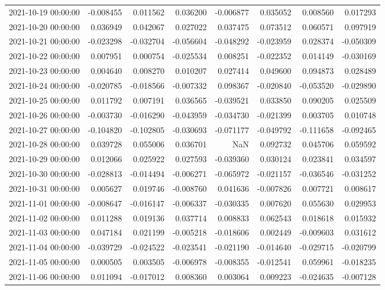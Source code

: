 \begin{tabular}{lrrrrrrr}
2021-10-19 00:00:00 & -0.008455 & 0.011562 & 0.036200 & -0.006877 & 0.035052 & 0.008560 & 0.017293 \\
2021-10-20 00:00:00 & 0.036949 & 0.042067 & 0.027022 & 0.037475 & 0.073512 & 0.060571 & 0.097919 \\
2021-10-21 00:00:00 & -0.023298 & -0.032704 & -0.056604 & -0.048292 & -0.023959 & 0.028374 & -0.050309 \\
2021-10-22 00:00:00 & 0.007951 & 0.000754 & -0.025534 & 0.008251 & -0.022352 & 0.014149 & -0.030169 \\
2021-10-23 00:00:00 & 0.004640 & 0.008270 & 0.010207 & 0.027414 & 0.049600 & 0.094873 & 0.028489 \\
2021-10-24 00:00:00 & -0.020785 & -0.018566 & -0.007332 & 0.098367 & -0.020840 & -0.053520 & -0.029890 \\
2021-10-25 00:00:00 & 0.011792 & 0.007191 & 0.036565 & -0.039521 & 0.033850 & 0.090205 & 0.025509 \\
2021-10-26 00:00:00 & -0.003730 & -0.016290 & -0.043959 & -0.034730 & -0.021399 & 0.003705 & 0.010748 \\
2021-10-27 00:00:00 & -0.104820 & -0.102805 & -0.030693 & -0.071177 & -0.049792 & -0.111658 & -0.092465 \\
2021-10-28 00:00:00 & 0.039728 & 0.055006 & 0.036701 & NaN & 0.092732 & 0.045706 & 0.059592 \\
2021-10-29 00:00:00 & 0.012066 & 0.025922 & 0.027593 & -0.039360 & 0.030124 & 0.023841 & 0.034597 \\
2021-10-30 00:00:00 & -0.028813 & -0.014494 & -0.006271 & -0.065972 & -0.021157 & -0.036546 & -0.031252 \\
2021-10-31 00:00:00 & 0.005627 & 0.019746 & -0.008760 & 0.041636 & -0.007826 & 0.007721 & 0.008617 \\
2021-11-01 00:00:00 & -0.008647 & -0.016147 & -0.006337 & -0.030335 & 0.007620 & 0.055630 & 0.029953 \\
2021-11-02 00:00:00 & 0.011288 & 0.019136 & 0.037714 & 0.008833 & 0.062543 & 0.018618 & 0.015932 \\
2021-11-03 00:00:00 & 0.047184 & 0.021199 & -0.005218 & -0.018606 & 0.002449 & -0.009603 & 0.031612 \\
2021-11-04 00:00:00 & -0.039729 & -0.024522 & -0.023541 & -0.021190 & -0.014640 & -0.029715 & -0.020799 \\
2021-11-05 00:00:00 & 0.000505 & 0.003505 & -0.006978 & -0.008355 & -0.012541 & 0.059961 & -0.018235 \\
2021-11-06 00:00:00 & 0.011094 & -0.017012 & 0.008360 & 0.003064 & 0.009223 & -0.024635 & -0.007128 \\

\end{tabular}

